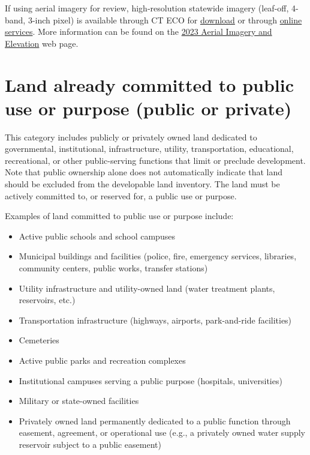 \documentclass[
  letterpaper,
  DIV=11,
  numbers=noendperiod]{scrreprt}
\providecommand{\tightlist}{%
  \setlength{\itemsep}{0pt}\setlength{\parskip}{0pt}}
\begin{document}
\begin{tcolorbox}[enhanced jigsaw, arc=.35mm, bottomrule=.15mm, breakable, colback=white, colframe=quarto-callout-note-color-frame, left=2mm, leftrule=.75mm, opacityback=0, rightrule=.15mm, toprule=.15mm]

If using aerial imagery for review, high‑resolution statewide imagery
(leaf-off, 4-band, 3-inch pixel) is available through CT ECO for
\href{https://maps.cteco.uconn.edu/download/}{download} or through
\href{https://maps.cteco.uconn.edu/map-services/}{online services}. More
information can be found on the
\href{https://maps.cteco.uconn.edu/data/flight2023/}{2023 Aerial Imagery
and Elevation} web page.

\end{tcolorbox}

\section{Land already committed to public use or purpose (public or
private)}\label{land-already-committed-to-public-use-or-purpose-public-or-private}

This category includes publicly or privately owned land dedicated to
governmental, institutional, infrastructure, utility, transportation,
educational, recreational, or other public-serving functions that limit
or preclude development. Note that public ownership alone does not
automatically indicate that land should be excluded from the developable
land inventory. The land must be actively committed to, or reserved for,
a public use or purpose.

Examples of land committed to public use or purpose include:

\begin{itemize}
\tightlist
\item
  Active public schools and school campuses
\item
  Municipal buildings and facilities (police, fire, emergency services,
  libraries, community centers, public works, transfer stations)
\item
  Utility infrastructure and utility-owned land (water treatment plants,
  reservoirs, etc.)
\item
  Transportation infrastructure (highways, airports, park-and-ride
  facilities)
\item
  Cemeteries
\item
  Active public parks and recreation complexes
\item
  Institutional campuses serving a public purpose (hospitals,
  universities)
\item
  Military or state-owned facilities
\item
  Privately owned land permanently dedicated to a public function
  through easement, agreement, or operational use (e.g., a privately
  owned water supply reservoir subject to a public easement)
\end{itemize}
\end{document}
